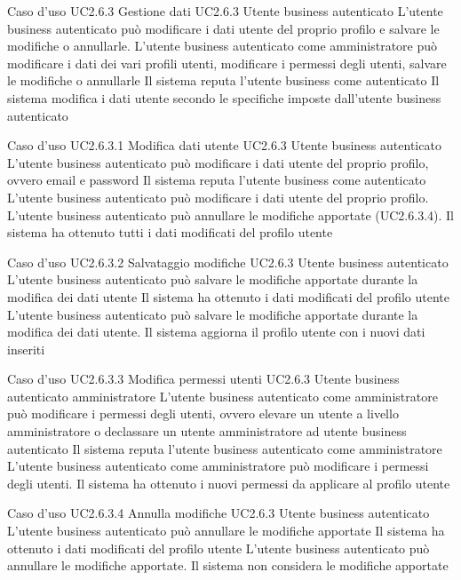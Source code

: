 \UCtitle
{Caso d'uso UC2.6.3}
{Gestione dati}
\UC
{UC2.6.3}
{Utente business autenticato}
{L'utente business autenticato può modificare i dati utente del proprio profilo e salvare le modifiche o annullarle. L'utente business autenticato come amministratore può modificare i dati dei vari profili utenti, modificare i permessi degli utenti, salvare le modifiche o annullarle}
{Il sistema reputa l'utente business come autenticato}
\post
{Il sistema modifica i dati utente secondo le specifiche imposte dall'utente business autenticato}

\UCtitle
{Caso d'uso UC2.6.3.1}
{Modifica dati utente}
\UC
{UC2.6.3}
{Utente business autenticato}
{L'utente business autenticato può modificare i dati utente del proprio profilo, ovvero email e password}
{Il sistema reputa l'utente business come autenticato}
\scenario
{L'utente business autenticato può modificare i dati utente del proprio profilo.}
\scenarioAlt
{
L'utente business autenticato può annullare le modifiche apportate (UC2.6.3.4).
}
\post
{Il sistema ha ottenuto tutti i dati modificati del profilo utente}

\UCtitle
{Caso d'uso UC2.6.3.2}
{Salvataggio modifiche}
\UC
{UC2.6.3}
{Utente business autenticato}
{L'utente business autenticato può salvare le modifiche apportate durante la modifica dei dati utente}
{Il sistema ha ottenuto i dati modificati del profilo utente}
\scenario
{L'utente business autenticato può salvare le modifiche apportate durante la modifica dei dati utente.}
\post
{Il sistema aggiorna il profilo utente con i nuovi dati inseriti}

\UCtitle
{Caso d'uso UC2.6.3.3}
{Modifica permessi utenti}
\UC
{UC2.6.3}
{Utente business autenticato amministratore}
{L'utente business autenticato come amministratore può modificare i permessi degli utenti, ovvero elevare un utente a livello amministratore o declassare un utente amministratore ad utente business autenticato}
{Il sistema reputa l'utente business autenticato come amministratore}
\scenario
{L'utente business autenticato come amministratore può modificare i permessi degli utenti.}
\post
{Il sistema ha ottenuto i nuovi permessi da applicare al profilo utente}

\UCtitle
{Caso d'uso UC2.6.3.4}
{Annulla modifiche}
\UC
{UC2.6.3}
{Utente business autenticato}
{L'utente business autenticato può annullare le modifiche apportate}
{Il sistema ha ottenuto i dati modificati del profilo utente}
\scenario
{L'utente business autenticato può annullare le modifiche apportate.}
\post
{Il sistema non considera le modifiche apportate}

